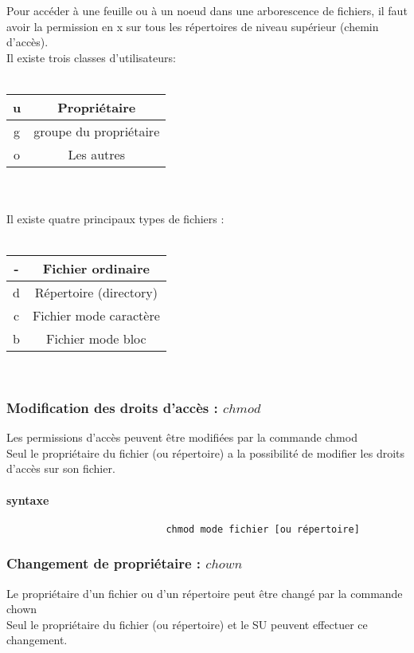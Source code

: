 				Pour accéder à une feuille ou à un noeud dans une arborescence de fichiers, il faut avoir la permission en x sur tous les répertoires de niveau supérieur (chemin d'accès).\\
				Il existe trois classes d'utilisateurs: \\ \\
				\begin{tabular}{|c|c|}
					\hline 
						u & Propriétaire \\
					\hline 
						g & groupe du propriétaire \\
					\hline 
						o & Les autres \\		
					\hline 
				\end{tabular}\\ \\
				Il existe quatre principaux types de fichiers :\\ \\
				\begin{tabular}{|c|c|}
					\hline 
						- & Fichier ordinaire \\
					\hline 
						d & Répertoire (directory) \\
					\hline 
						c & Fichier mode caractère \\		
					\hline 
						b & Fichier mode bloc \\		
					\hline 					
				\end{tabular}\\
				\subsubsection{Modification des droits d'accès : $chmod$}
					Les permissions d'accès peuvent être modifiées par la commande chmod\\
					Seul le propriétaire du fichier (ou répertoire) a la possibilité de modifier les droits d'accès sur son fichier.\\
					\paragraph{syntaxe}
						\begin{verbatim}
							chmod mode fichier [ou répertoire]
						\end{verbatim}						
				\subsubsection{Changement de propriétaire : $chown$}					
					Le propriétaire d'un fichier ou d'un répertoire peut être changé par la commande chown \\
					Seul le propriétaire du fichier (ou répertoire) et le SU peuvent effectuer ce changement.
